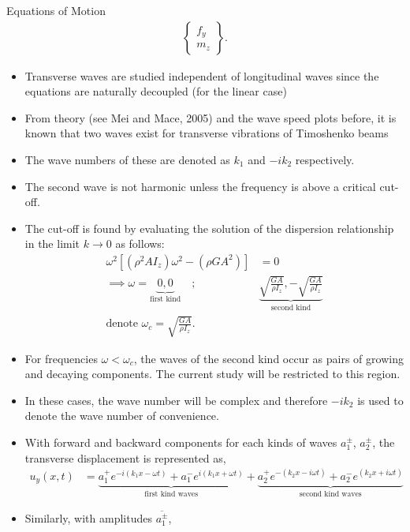 \documentclass[aspectratio=169]{beamertmd}
\begin{document}
\begin{frame}[allowframebreaks]
\begin{block}{Equations of Motion}
{\begin{align*}
\begin{Bmatrix}
          f_y\\ m_z\end{Bmatrix}. 
      \end{align*}}
  \end{block}
  \begin{itemize}
  \item Transverse waves are studied independent of longitudinal waves
    since the equations are naturally decoupled (for the linear case)
  \item From theory (see Mei and Mace, 2005) and the wave speed plots
    before, it is known that two waves exist for transverse vibrations
    of Timoshenko beams
  \item The wave numbers of these are denoted as $k_1$ and $-i k_2$
    respectively.
  \item The second wave is not harmonic unless the frequency is above
    a critical cut-off.
  \item The cut-off is found by evaluating the solution of the
    dispersion relationship in the limit $k\to 0$ as follows:
    \begin{align*}
      \omega^2 \left[ (\rho^2AI_z)\omega^2 - (\rho GA^2)\right] &= 0\\
      \implies \omega = \underbrace{0, 0}_{\text{first kind}}
      \quad;\quad &\underbrace{\sqrt{\frac{GA}{\rho I_z}},
                    -\sqrt{\frac{GA}{\rho I_z}}}_{\text{second kind}}\\
      \text{denote } \omega_c = \sqrt{\frac{GA}{\rho I_z}}.
    \end{align*}
  \item For frequencies $\omega<\omega_c$, the waves of the second
    kind occur as pairs of growing and decaying components. The
    current study will be restricted to this region. 
  \item In these cases, the wave number will be complex and therefore
    $-i k_2$ is used to denote the wave number of convenience.
  \item With forward and backward components for each kinds of waves
    $a_1^\pm$, $a_2^\pm$, the transverse displacement is represented as,
    \begin{align*}
      u_y(x, t) &= \underbrace{a_1^+e^{-i(k_1x-\omega t)} +
                  a_1^-e^{i(k_1x+\omega t)}}_{\text{first kind waves}} +
                  \underbrace{a_2^+e^{-(k_2x-i\omega t)} + a_2^-e^{(k_2x+i\omega
                  t)}}_{\text{second kind waves}}
    \end{align*}
  \item Similarly, with amplitudes $\overline{a_1^\pm}$,

\end{itemize}
\end{frame}
\end{document}
